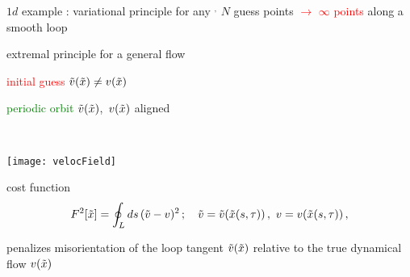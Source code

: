 \begin{frame}{$1d$ example : variational principle for any {\po}
    $^,$
}
$N$ guess points \textcolor{red}{$\to$ $\infty$ points}
along a smooth loop
\end{frame}

%
%
%
%
%


\begin{frame}{extremal principle for a general flow}
\begin{center}
\begin{minipage}[c]{0.55\textwidth}

	\vskip 10pt

\textcolor{red}{initial guess}
$\tilde{v}(\tilde{x})
	\neq
v(\tilde{x})$

	\vskip 1cm

\textcolor{green}{periodic orbit}
$\tilde{v}(\tilde{x})$,~$v(\tilde{x})$
aligned
\end{minipage}%
~~~~~~~\begin{minipage}[c]{0.40\textwidth}
	\begin{center}
	\vskip 10pt
	\texttt{[image: velocField]}
	\end{center}
\end{minipage}
\end{center}

\begin{block}{cost function}%
\[
F^2[\tilde{x}] =
            \oint_L ds\,(\tilde{v}-v)^2
    \,;\quad
    \tilde{v} = \tilde{v}(\tilde{x}(s,\tau))\,,\,\,
    v = v(\tilde{x}(s,\tau))
\,,
\]
\end{block}

\bigskip

penalizes misorientation of the loop tangent
$\tilde{v}(\tilde{x})$
relative to the true dynamical flow $v(\tilde{x})$
\end{frame}

